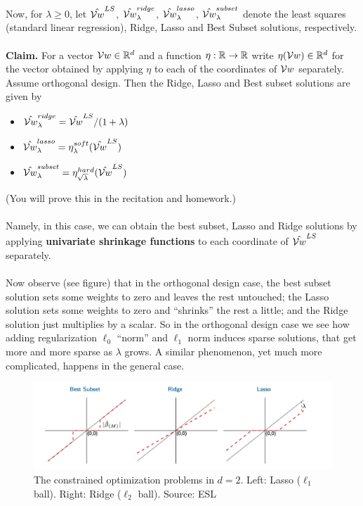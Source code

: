   ~\\
  Now, for $\lambda\geq 0$, let $\hat{\mathcal{V}{w}}^{LS}$, 
      $\hat{\mathcal{V}{w}}_\lambda^{ridge}$,
      $\hat{\mathcal{V}{w}}_\lambda^{lasso}$,
      $\hat{\mathcal{V}{w}}_\lambda^{subset}$
      denote the least squares (standard linear regression), Ridge, Lasso and
      Best Subset solutions, respectively.  
      \\~\\
      {\bf Claim.} 
      For a vector $\mathcal{V}{w}\in\mathbb{R}^d$ and a function $\eta:\mathbb{R}\to\mathbb{R}$ write 
      $\eta(\mathcal{V}{w})\in\mathbb{R}^d$ for the vector obtained by applying $\eta$ to each
      of the coordinates of $\mathcal{V}{w}$ separately.
      Assume orthogonal design. Then the Ridge, Lasso and Best
      subset solutions are given by 
      \begin{itemize}
        \item $\hat{\mathcal{V}{w}}_\lambda^{ridge} = \hat{\mathcal{V}{w}}^{LS} / (1+\lambda) $
        \item $\hat{\mathcal{V}{w}}_\lambda^{lasso} = \eta^{soft}_\lambda(\hat{\mathcal{V}{w}}^{LS})  $
        \item $\hat{\mathcal{V}{w}}_\lambda^{subset} = \eta^{hard}_{\sqrt{\lambda}}(\hat{\mathcal{V}{w}}^{LS})  $
      \end{itemize}
      (You will prove this in the recitation and homework.)
      \\~\\
      Namely, in this case, we can obtain the best subset, Lasso and Ridge
      solutions by applying {\bf univariate shrinkage functions} to each
      coordinate of $\hat{\mathcal{V}{w}}^{LS}$ separately. 
\\~\\
      Now observe (see figure) that in the orthogonal design case, 
      the best subset solution sets some weights to zero and leaves the rest
      untouched; the Lasso solution sets some weights to zero and ``shrinks''
      the rest a little; and the Ridge solution just multiplies by a scalar. So
      in the orthogonal design case we see how adding regularization 
      $\ell_0$ ``norm'' and $\ell_1$ norm induces sparse solutions, that get
      more and more sparse as $\lambda$ grows. A similar phenomenon, yet much
      more complicated, happens in the general case.
\begin{figure}[H]
      \centering
      \includegraphics[width=6in]{orthogonal_design_shrink.jpeg}
      \caption{The constrained optimization problems in $d=2$. Left: Lasso
        ($\ell_1$ ball). Right: Ridge ($\ell_2$ ball).
      Source: ESL}
    \end{figure}




